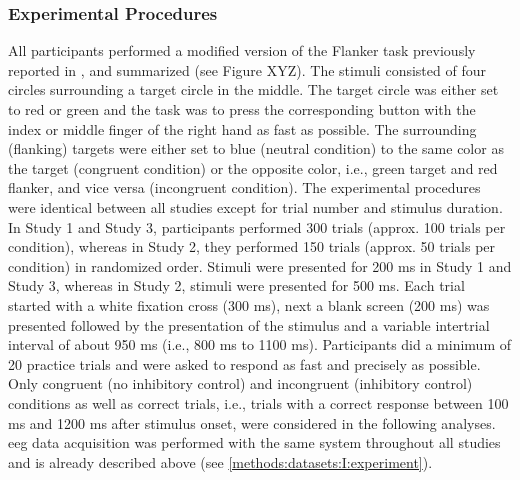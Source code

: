 \subsubsection{Experimental Procedures}
All participants performed a modified version of the Flanker task previously reported in \cite{Reuter2017, Winneke2012, Winneke2019}, and summarized \cite{Reuter2019} (see Figure XYZ). The stimuli consisted of four circles surrounding a target circle in the middle. The target circle was either set to red or green and the task was to press the corresponding button with the index or middle finger of the right hand as fast as possible. The surrounding (flanking) targets were either set to blue (neutral condition) to the same color as the target (congruent condition) or the opposite color, i.e., green target and red flanker, and vice versa (incongruent condition). The experimental procedures were identical between all studies except for trial number and stimulus duration. In Study 1 and Study 3, participants performed 300 trials (approx. 100 trials per condition), whereas in Study 2, they performed 150 trials (approx. 50 trials per condition) in randomized order. Stimuli were presented for 200 ms in Study 1 and Study 3, whereas in Study 2, stimuli were presented for 500 ms. Each trial started with a white fixation cross (300 ms), next a blank screen (200 ms) was presented followed by the presentation of the stimulus and a variable intertrial interval of about 950 ms (i.e., 800 ms to 1100 ms). Participants did a minimum of 20 practice trials and were asked to respond as fast and precisely as possible. Only congruent (no inhibitory control) and incongruent (inhibitory control) conditions as well as correct trials, i.e., trials with a correct response between 100 ms and 1200 ms after stimulus onset, were considered in the following analyses.\\
\Gls{eeg} data acquisition was performed with the same system throughout all studies and is already described above (see \autoref{methods:datasets:I:experiment}). 



